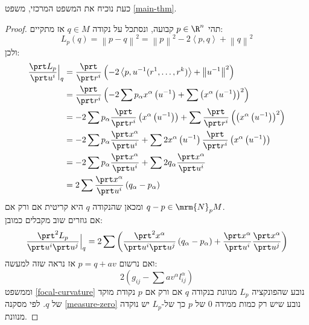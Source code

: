 \documentclass{article}
\theoremstyle{definition}
\newcommand{\norm}[1]{\left\lVert#1\right\rVert}
\begin{document}
	כעת נוכיח את המשפט המרכזי, משפט \ref{main-thm}.
	\begin{proof}
		תהי
		\(p\in\R^n\)
		קבועה, ונסתכל על נקודה
		\(q\in M\)
		אז מתקיים:
		\[
			L_p(q)
			=\norm{p-q}^2
			=\norm{p}^2 - 2 \left\langle p,q \right\rangle + \norm{q}^2
		\]
		ולכן:
		\begin{equation*}\begin{split}
			\frac{\prt L_p}{\prt u^i}\Big|_q
			&= \frac{\prt}{\prt r^i}\left(- 2 \left\langle p,u^{-1}(r^1,\dotsc,r^k) \right\rangle + \norm{u^{-1}}^2\right)
			\\&= \frac{\prt}{\prt r^i}\left(- 2 \sum p_\alpha x^\alpha\left(u^{-1}\right) + \sum\left(x^\alpha\left(u^{-1}\right)\right)^2 \right)
			\\&= - 2 \sum p_\alpha \frac{\prt}{\prt r^i}\left(x^\alpha\left(u^{-1}\right)\right) + \sum\frac{\prt}{\prt r^i}\left(\left(x^\alpha\left(u^{-1}\right)\right)^2 \right)
			\\&= - 2 \sum p_\alpha \frac{\prt x^\alpha}{\prt u^i} + \sum 2 x^\alpha\left(u^{-1}\right) \frac{\prt}{\prt r^i}\left(x^\alpha\left(u^{-1}\right) \right)
			\\&= - 2 \sum p_\alpha \frac{\prt x^\alpha}{\prt u^i} + \sum 2 q_\alpha \frac{\prt x^\alpha}{\prt u^i}
			\\&= 2 \sum \frac{\prt x^\alpha}{\prt u^i} \left( q_\alpha - p_\alpha \right)
		\end{split}\end{equation*}
		ומכאן שהנקודה \(q\) היא קריטית אם ורק אם
		\(q-p\in \mrm{N}_p M\).
		\\
		אם גוזרים שוב מקבלים כמובן:
		\[
			\frac{\prt^2 L_p}{\prt u^i \prt u^j}\Big|_q
			=2 \sum \left(\frac{\prt^2 x^\alpha}{\prt u^i \prt u^j} \left( q_\alpha - p_\alpha \right) + \frac{\prt x^\alpha}{\prt u^i}\frac{\prt x^\alpha}{\prt u^j} \right)
		\]
		ואם נרשום
		\(p=q+av\)
		אז נראה שזה למעשה:
		\[
			2\left(g_{ij}-\sum av^\alpha l^\alpha_{ij}\right)
		\]
		וממשפט \ref{focal-curvature} נובע שהפונקציה
		\(L_p\)
		מנוונת בנקודה \(q\) אם ורק אם \(p\) נקודת מוקד של \(q\).
		לפי מסקנה \ref{measure-zero} נובע שיש רק כמות ממידה \(0\) של \(p\) כך של-\(L_p\) יש נוקדה מנוונת.
	\end{proof}
	
\end{document}
